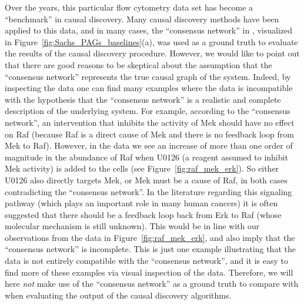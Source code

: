 \documentclass[twoside,11pt]{article}
\begin{document}
Over the years, this particular flow cytometry data set has become a ``benchmark'' in causal discovery. 
Many causal discovery methods have been applied to this data, and in many
cases, the ``consensus network'' in \citet{SPP05}, visualized in Figure~\ref{fig:Sachs_PAGs_baselines}(a), 
was used as a ground truth
to evaluate the results of the causal discovery procedure. However, we would like
to point out that there are good reasons to be skeptical about the assumption that the ``consensus network'' 
represents the true causal graph of the system.
Indeed, by inspecting the data one can find many examples where the data is 
incompatible with the hypothesis that the ``consensus network'' is a realistic and complete
description of the underlying system. For example, according to the ``consensus network'', an intervention that
inhibits the activity of Mek should have no effect on Raf (because Raf is
a direct cause of Mek and there is no feedback loop from Mek to Raf). 
However, in the data we see an increase of more
than one order of magnitude in the abundance of Raf when U0126 (a reagent assumed
to inhibit Mek activity) is added to the cells (see Figure~\ref{fig:raf_mek_erk}). 
So either U0126 also directly targets Mek, or Mek must be a cause of Raf, in both cases contradicting the
``consensus network''. In the literature regarding this signaling
pathway (which plays an important role in many human cancers) it is often suggested that there 
should be a feedback loop back from Erk to Raf
(whose molecular mechanism is still unknown).
This would be in line with our observations from the data in Figure~\ref{fig:raf_mek_erk}, and also imply that the ``consensus
network'' is incomplete.
This is just one example illustrating that the data is not entirely compatible with
the ``consensus network'', and it is easy to find more of these examples via visual 
inspection of the data.
Therefore, we will here \emph{not} make use of the ``consensus network'' as a ground truth 
to compare with when evaluating the output of the causal discovery algorithms.
\end{document}
